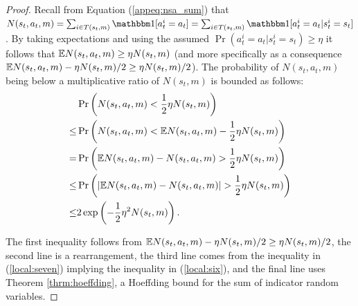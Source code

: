             \begin{proof}
                Recall from Equation (\ref{appeq:nsa_sum}) that $N(s_t,a_t,m)=\sum_{i\in T(s_t,m)} \one[a^i_t=a_t] = \sum_{i\in T(s_t,m)} \one[a^i_t=a_t | s^i_t=s_t]$ . By taking expectations  and using the assumed $\Pr(a^i_t=a_t|s^i_t=s_t)\geq\eta$ it follows that $\mathbb{E}N(s_t,a_t,m) \geq \eta N(s_t,m)$ (and more specifically as a consequence $\mathbb{E}N(s_t,a_t,m) - \eta N(s_t,m)/2 \geq \eta N(s_t,m)/2$). The probability of $N(s_t,a_t,m)$ being below a multiplicative ratio of $N(s_t,m)$ is bounded as follows:
                \begin{align}
                    & \Pr\left(N(s_t,a_t,m) < \frac{1}{2}\eta N(s_t,m)\right) \\
                        \leq & \Pr\left(N(s_t,a_t,m) < \mathbb{E}N(s_t,a_t,m) - \frac{1}{2}\eta N(s_t,m)\right) \\
                        = & \Pr\left(\mathbb{E}N(s_t,a_t,m) - N(s_t,a_t,m) > \frac{1}{2}\eta N(s_t,m)\right) 
                            \label{local:seven} \\
                        \leq & \Pr\left(|\mathbb{E}N(s_t,a_t,m) - N(s_t,a_t,m)| > \frac{1}{2}\eta N(s_t,m)\right) 
                            \label{local:six} \\
                        \leq & 2\exp\left(-\frac{1}{2}\eta^2N(s_t,m)\right). \label{eq:bound_nsa}
                \end{align}
                
                The first inequality follows from $\mathbb{E}N(s_t,a_t,m) - \eta N(s_t,m)/2 \geq \eta N(s_t,m)/2$, the second line is a rearrangement, the third line comes from the inequality in (\ref{local:seven}) implying the inequality in (\ref{local:six}), and the final line uses Theorem \ref{thrm:hoeffding}, a Hoeffding bound for the sum of indicator random variables. 
                

\end{proof}
